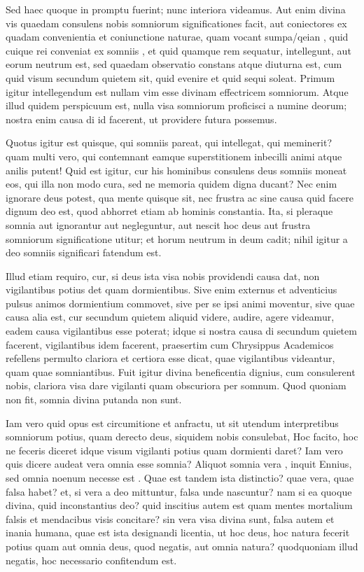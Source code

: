  Sed haec quoque in promptu fuerint; nunc interiora videamus. Aut enim divina vis quaedam consulens nobis somniorum significationes facit, aut coniectores ex quadam convenientia et coniunctione naturae, quam vocant sumpa/qeian , quid cuique rei conveniat ex somniis , et quid quamque rem sequatur, intellegunt, aut eorum neutrum est, sed quaedam observatio constans atque diuturna est, cum quid visum secundum quietem sit, quid evenire et quid sequi soleat. Primum igitur intellegendum est nullam vim esse divinam effectricem somniorum. Atque illud quidem perspicuum est, nulla visa somniorum proficisci a numine deorum; nostra enim causa di id facerent, ut providere futura possemus.

 Quotus igitur est quisque, qui somniis pareat, qui intellegat, qui meminerit? quam multi vero, qui contemnant eamque superstitionem inbecilli animi atque anilis putent! Quid est igitur, cur his hominibus consulens deus somniis moneat eos, qui illa non modo cura, sed ne memoria quidem digna ducant? Nec enim ignorare deus potest, qua mente quisque sit, nec frustra ac sine causa quid facere dignum deo est, quod abhorret etiam ab hominis constantia. Ita, si pleraque somnia aut ignorantur aut negleguntur, aut nescit hoc deus aut frustra somniorum significatione utitur; et horum neutrum in deum cadit; nihil igitur a deo somniis significari fatendum est.

 Illud etiam requiro, cur, si deus ista visa nobis providendi causa dat, non vigilantibus potius det quam dormientibus. Sive enim externus et adventicius pulsus animos dormientium commovet, sive per se ipsi animi moventur, sive quae causa alia est, cur secundum quietem aliquid videre, audire, agere videamur, eadem causa vigilantibus esse poterat; idque si nostra causa di secundum quietem facerent, vigilantibus idem facerent, praesertim cum Chrysippus Academicos refellens permulto clariora et certiora esse dicat, quae vigilantibus videantur, quam quae somniantibus. Fuit igitur divina beneficentia dignius, cum consulerent nobis, clariora visa dare vigilanti quam obscuriora per somnum. Quod quoniam non fit, somnia divina putanda non sunt.

 Iam vero quid opus est circumitione et anfractu, ut sit utendum interpretibus somniorum potius, quam derecto deus, siquidem nobis consulebat, Hoc facito, hoc ne feceris diceret idque visum vigilanti potius quam dormienti daret? Iam vero quis dicere audeat vera omnia esse somnia? Aliquot somnia vera , inquit Ennius, sed omnia noenum necesse est . Quae est tandem ista distinctio? quae vera, quae falsa habet? et, si vera a deo mittuntur, falsa unde nascuntur? nam si ea quoque divina, quid inconstantius deo? quid inscitius autem est quam mentes mortalium falsis et mendacibus visis concitare? sin vera visa divina sunt, falsa autem et inania humana, quae est ista designandi licentia, ut hoc deus, hoc natura fecerit potius quam aut omnia deus, quod negatis, aut omnia natura? quodquoniam illud negatis, hoc necessario confitendum est.

